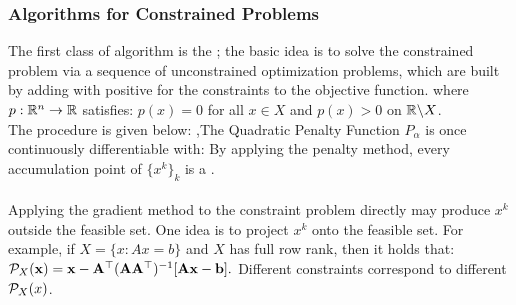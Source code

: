 \documentclass[10pt]{report}
\begin{document}
\subsubsection{Algorithms for Constrained Problems}
The first class of algorithm is the ; the basic idea is to solve the constrained problem via a sequence of unconstrained optimization problems, which are built by adding 
with positive  for the constraints to the objective function.
where $p:\RR^n\to\RR$ satisfies: $p(x)=0$ for all $x\in X$ and $p(x)>0$ on $\RR \backslash X$.\\
The procedure is given below:
\sep{The Quadratic Penalty Function}
$P_\alpha$ is once continuously differentiable with:
By applying the penalty method, every accumulation point of $\{x^k\}_k$ is a .\\
\\
Applying the gradient method to the constraint problem directly may produce $x^k$ outside the feasible set. One idea is to project $x^k$ onto the feasible set.
For example, if $X=\{x:Ax=b\}$ and $X$ has full row rank, then it holds that:
$\mathcal{P}_X(\mathbf{x})=\mathbf{x}-\mathbf{A}^\top(\mathbf{A}\mathbf{A}^\top)^{-1}[\mathbf{A}\mathbf{x}-\mathbf{b}].$
Different constraints correspond to different $\mathcal{P}_X(x)$.
\end{document}
